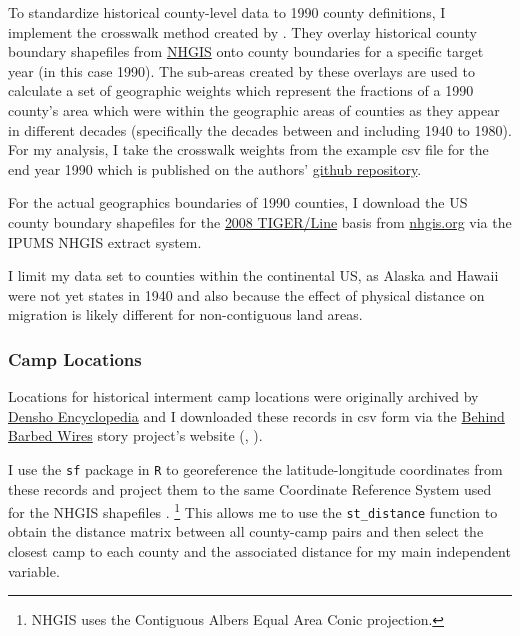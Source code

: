 \documentclass[12pt]{article}
\begin{document}
To standardize historical county-level data to 1990 county definitions, I implement the crosswalk
method created by \cite{eckert_method_2020}. They overlay historical
county boundary shapefiles from \href{https://www.nhgis.org/}{NHGIS}
onto county boundaries for a specific target year (in this case 1990).
The sub-areas created by these overlays are used to calculate a set of
geographic weights which represent the fractions of a 1990 county's area
which were within the geographic areas of counties as they appear in
different decades (specifically the decades between and including 1940
to 1980). For my analysis, I take the crosswalk weights from the example
csv file for the end year 1990 which is published on the authors'
\href{https://github.com/liang-jack-a/EGLP_Crosswalk/tree/master}{github
repository}.

For the actual geographics boundaries of 1990 counties, I download the US county boundary shapefiles for the \href{https://www.census.gov/geographies/mapping-files/time-series/geo/tiger-line-file.html}{2008 TIGER/Line} basis from \url{nhgis.org} via the IPUMS NHGIS extract system.

I limit my data set to counties within the continental US, as Alaska and Hawaii were not yet states in 1940 and also because the effect of physical distance on migration is likely different for non-contiguous land areas.


\subsubsection{Camp Locations}\label{camp-locations}

Locations for historical interment camp locations were originally archived by
\href{http://encyclopedia.densho.org/War_Relocation_Authority/\#Planning_the_Camps}{Densho
Encyclopedia} and I downloaded these records in csv form via the
\href{https://www.arcgis.com/home/item.html?id=69183af8d45d4f46a9dc4eba99440891}{Behind
Barbed Wires} story project's website
(\cite{chrkan_behind_2019}, \cite{robinson_war_2023}).

I use the \texttt{sf} package in \texttt{R} to georeference the latitude-longitude coordinates from these records and project them to the same Coordinate Reference System used for the NHGIS shapefiles \citep{pebesma_simple_2018}.
\footnote{NHGIS uses the Contiguous Albers Equal Area Conic projection.}
This allows me to use the \texttt{st\_distance} function to obtain the distance matrix between all county-camp pairs and then select the closest camp to each county and the associated distance for my main independent variable.
\end{document}
